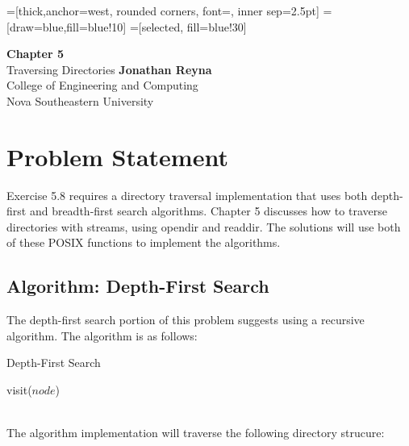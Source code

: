 \documentclass[a4paper,12pt,sffamily]{article}
\begin{document}
=[thick,anchor=west, rounded corners, font={\scriptsize\ttfamily}, inner sep=2.5pt]
=[draw=blue,fill=blue!10]
=[selected, fill=blue!30]

\begin{titlepage}
  \begin{center}
    \vspace*{1cm}
    \Huge
    \textbf{Chapter 5}\\
    \vspace{0.5cm}
    \LARGE
    Traversing Directories
    \vfill
    \Large
    \textbf{Jonathan Reyna}\\
    College of Engineering and Computing\\
    Nova Southeastern University\\
    \usdate{\today}
  \end{center}
\end{titlepage}

\section{Problem Statement}
Exercise 5.8 requires a directory traversal implementation that uses both depth-first and breadth-first search algorithms. Chapter 5 discusses how to traverse directories with streams, using opendir and readdir. The solutions will use both of these POSIX functions to implement the algorithms.
\subsection{Algorithm: Depth-First Search}
The depth-first search portion of this problem suggests using a recursive algorithm. The algorithm is as follows:
\begin{algorithm}
  \caption{Depth-First Search}
  \label{depthfirst}
  \begin{algorithmic}[1]
    \State visit($node$)
    \State{}
    \EndIf
    \EndFor
    \EndProcedure
  \end{algorithmic}
\end{algorithm}\\
The algorithm implementation will traverse the following directory strucure:\\
\end{document}
